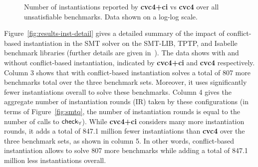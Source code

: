 \documentclass[oribibl]{llncs}
\begin{document}
\begin{figure}[t]
\caption{ Number of instantiations reported by
{\bf cvc4+ci} vs {\bf cvc4} over all unsatisfiable benchmarks.
Data shown on a log-log scale.
}
\label{fig:cbqi-scatter}
\end{figure}

Figure~\ref{fig:results-inst-detail}
gives a detailed summary of the impact of conflict-based instantiation in the SMT solver \cvc
on the SMT-LIB, TPTP, and Isabelle benchmark libraries (further details are given in~\cite{ReynoldsTinelliMoura14}).
The data shows \cvc with and without conflict-based instantiation, indicated by {\bf cvc4+ci} and {\bf cvc4} respectively.
Column 3 shows that \cvc with conflict-based instantiation
solves a total of 807 more benchmarks total over the three benchmark sets.
Moreover, it uses significantly fewer instantiations overall to solve these benchmarks.
Column 4 gives the aggregate number of instantiation rounds (IR) taken by these configurations
(in terms of Figure~\ref{fig:smtq}, the number of instantiation rounds is equal to the number of calls to $\small\mathsf{check}_\forall$).
While {\bf cvc4+ci} considers many more instantiation rounds, it adds a total
of 847.1 million fewer instantiations than {\bf cvc4} over the three benchmark sets, as shown in column 5.
In other words, conflict-based instantiation allows \cvc to solve 807 more benchmarks while adding a total of 847.1 million 
less instantiations overall.
\end{document}
